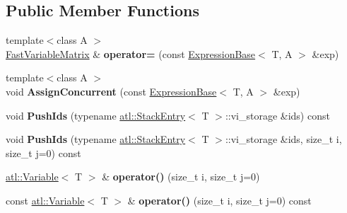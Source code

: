 \subsection*{Public Member Functions}
\begin{DoxyCompactItemize}
\item 
\hypertarget{structatl_1_1_fast_variable_matrix_afa01a66af96313c199bc2aa6e7f0fa74}{{\footnotesize template$<$class A $>$ }\\\hyperlink{structatl_1_1_fast_variable_matrix}{Fast\+Variable\+Matrix} \& {\bfseries operator=} (const \hyperlink{structatl_1_1_expression_base}{Expression\+Base}$<$ T, A $>$ \&exp)}\label{structatl_1_1_fast_variable_matrix_afa01a66af96313c199bc2aa6e7f0fa74}

\item 
\hypertarget{structatl_1_1_fast_variable_matrix_a227d98f3a20e3fcd8cf6a29a5616b5f3}{{\footnotesize template$<$class A $>$ }\\void {\bfseries Assign\+Concurrent} (const \hyperlink{structatl_1_1_expression_base}{Expression\+Base}$<$ T, A $>$ \&exp)}\label{structatl_1_1_fast_variable_matrix_a227d98f3a20e3fcd8cf6a29a5616b5f3}

\item 
\hypertarget{structatl_1_1_fast_variable_matrix_a8af9c6e87cfd817ab521eb4835b7317a}{void {\bfseries Push\+Ids} (typename \hyperlink{structatl_1_1_stack_entry}{atl\+::\+Stack\+Entry}$<$ T $>$\+::vi\+\_\+storage \&ids) const }\label{structatl_1_1_fast_variable_matrix_a8af9c6e87cfd817ab521eb4835b7317a}

\item 
\hypertarget{structatl_1_1_fast_variable_matrix_ab6eedc4ee8dd784c0e72d77ab018439b}{void {\bfseries Push\+Ids} (typename \hyperlink{structatl_1_1_stack_entry}{atl\+::\+Stack\+Entry}$<$ T $>$\+::vi\+\_\+storage \&ids, size\+\_\+t i, size\+\_\+t j=0) const }\label{structatl_1_1_fast_variable_matrix_ab6eedc4ee8dd784c0e72d77ab018439b}

\item 
\hypertarget{structatl_1_1_fast_variable_matrix_acc839a5c65857c92db2334211f396406}{\hyperlink{structatl_1_1_variable}{atl\+::\+Variable}$<$ T $>$ \& {\bfseries operator()} (size\+\_\+t i, size\+\_\+t j=0)}\label{structatl_1_1_fast_variable_matrix_acc839a5c65857c92db2334211f396406}

\item 
\hypertarget{structatl_1_1_fast_variable_matrix_ad6d07f68200eabfc5d08a899ed5374fb}{const \hyperlink{structatl_1_1_variable}{atl\+::\+Variable}$<$ T $>$ \& {\bfseries operator()} (size\+\_\+t i, size\+\_\+t j=0) const }\label{structatl_1_1_fast_variable_matrix_ad6d07f68200eabfc5d08a899ed5374fb}


\end{DoxyCompactItemize}
